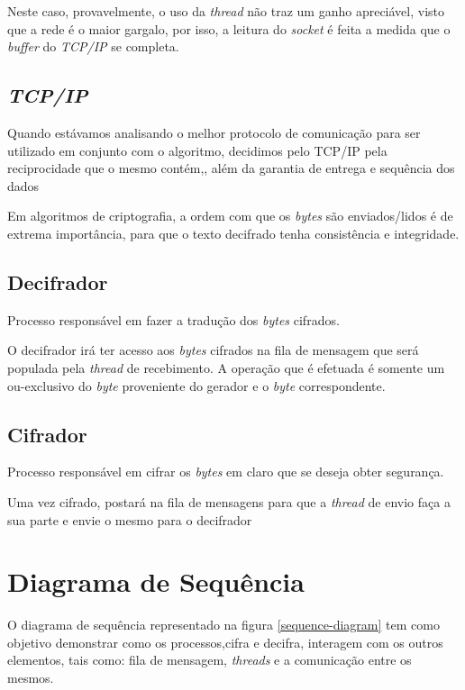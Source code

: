 Neste caso, provavelmente, o uso da \textit{thread} não traz um ganho apreciável, visto que a rede é o maior gargalo, por isso, a leitura do \textit{socket} é feita a medida que o \textit{buffer} do \textit{TCP/IP} se completa.

\subsection{\textit{TCP/IP}}

Quando estávamos analisando o melhor protocolo de comunicação para ser utilizado em conjunto com o algoritmo, decidimos pelo TCP/IP pela reciprocidade que o mesmo contém,, além da garantia de entrega e sequência dos dados 

Em algoritmos de criptografia, a ordem com que os \textit{bytes} são enviados/lidos é de extrema importância, para que o texto decifrado tenha consistência e integridade. 
\subsection{Decifrador}

Processo responsável em fazer a tradução dos \textit{bytes} cifrados. 

O decifrador irá ter acesso aos \textit{bytes} cifrados na fila de mensagem que será populada pela \textit{thread} de recebimento. A operação que é efetuada é somente um ou-exclusivo do \textit{byte} proveniente do gerador e o \textit{byte} correspondente.

\subsection{Cifrador}

Processo responsável em cifrar os \textit{bytes} em claro que se deseja obter segurança.

Uma vez cifrado, postará na fila de mensagens para que a \textit{thread} de envio faça a sua parte e envie o mesmo para o decifrador

\section{Diagrama de Sequência}

O diagrama de sequência representado na figura \ref{sequence-diagram} tem como objetivo demonstrar como os processos,cifra e  decifra, interagem com os outros elementos, tais como: fila de mensagem, \textit{threads} e a comunicação entre os mesmos. 

